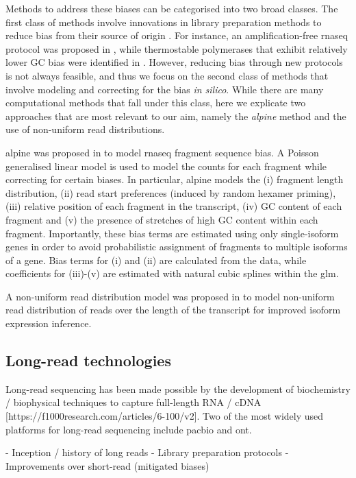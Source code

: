 Methods to address these biases can be categorised into two broad classes. The first class of methods involve innovations in library preparation methods to reduce bias from their source of origin \cite{Vandijk2014}. For instance, an amplification-free \gls{rnaseq} protocol was proposed in \cite{Mamanova2010}, while thermostable polymerases that exhibit relatively lower GC bias were identified in \cite{Quail2012}. However, reducing bias through new protocols is not always feasible, and thus we focus on the second class of methods that involve modeling and correcting for the bias \textit{in silico}. While there are many computational methods that fall under this class, here we explicate two approaches that are most relevant to our aim, namely the \textit{alpine}\cite{Love2016} method and the use of non-uniform read distributions. 

alpine was proposed in \cite{Love2016} to model \gls{rnaseq} fragment sequence bias. A Poisson generalised linear model is used to model the counts for each fragment while correcting for certain biases. In particular, alpine models the (i) fragment length distribution, (ii) read start preferences (induced by random hexamer priming), (iii) relative position of each fragment in the transcript, (iv) GC content of each fragment and (v) the presence of stretches of high GC content within each fragment. Importantly, these bias terms are estimated using only single-isoform genes in order to avoid probabilistic assignment of fragments to multiple isoforms of a gene. Bias terms for (i) and (ii) are calculated from the data, while coefficients for (iii)-(v) are estimated with natural cubic splines within the \gls{glm}.

A non-uniform read distribution model was proposed in \cite{Zhengpeng2010} to model non-uniform read distribution of reads over the length of the transcript for improved isoform expression inference.  

\subsection{Long-read technologies}

Long-read sequencing has been made possible by the development of biochemistry / biophysical techniques to capture full-length RNA / cDNA [https://f1000research.com/articles/6-100/v2]. Two of the most widely used platforms for long-read sequencing include \gls{pacbio} and \gls{ont}.    

- Inception / history of long reads
- Library preparation protocols
- Improvements over short-read (mitigated biases)

